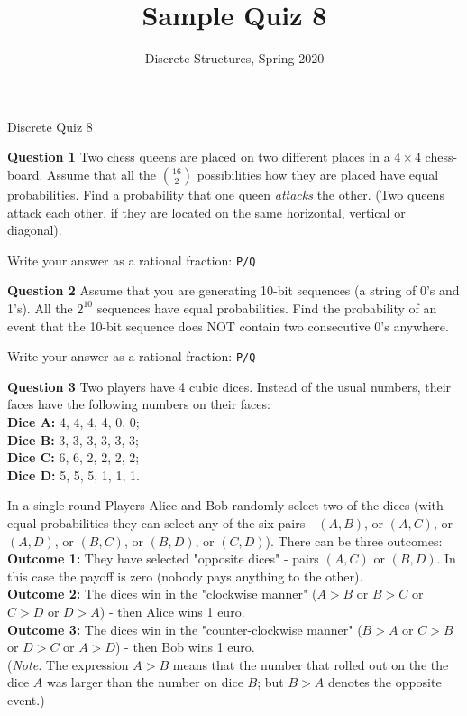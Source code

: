 \documentclass[jou]{apa6}
\title{Sample Quiz 8}
\author{Discrete Structures, Spring 2020}
\affiliation{RBS}
\begin{document}
\thispagestyle{empty}

\twocolumn
{\Large Discrete Quiz 8}

\vspace{10pt}
{\bf Question 1} 
Two chess queens are placed on two different places in a $4 \times 4$ chess-board.
Assume that all the ${16 \choose 2}$ possibilities how they are placed have equal probabilities.
Find a probability that one queen {\em attacks} the other. (Two queens attack each other, if
they are located on the same horizontal, vertical or diagonal).

Write your answer as a rational fraction: {\tt P/Q}

\vspace{10pt}
{\bf Question 2} Assume that you are generating 10-bit sequences (a string of 0's and 1's). 
All the $2^{10}$ sequences have equal probabilities. 
Find the probability of an event that the 10-bit sequence does NOT contain two consecutive 0's anywhere.

Write your answer as a rational fraction: {\tt P/Q}

\vspace{10pt}
{\bf Question 3}
Two players have 4 cubic dices. Instead of the usual numbers, their faces have the following numbers on their faces:\\
{\bf Dice A:} 4, 4, 4, 4, 0, 0;\\
{\bf Dice B:} 3, 3, 3, 3, 3, 3;\\
{\bf Dice C:} 6, 6, 2, 2, 2, 2;\\
{\bf Dice D:} 5, 5, 5, 1, 1, 1.

In a single round Players Alice and Bob randomly select two of the dices (with equal probabilities they can 
select any of the six pairs - $(A,B)$, or $(A,C)$, or $(A,D)$, or $(B,C)$, or $(B,D)$, or $(C,D)$).
There can be three outcomes:\\
{\bf Outcome 1:} They have selected "opposite dices" - pairs $(A,C)$ or $(B,D)$. In this case the payoff
is zero (nobody pays anything to the other).\\
{\bf Outcome 2:} The dices win in the "clockwise manner" ($A>B$ or $B>C$ or $C>D$ or $D>A$) - then Alice
wins 1 euro.\\
{\bf Outcome 3:} The dices win in the "counter-clockwise manner" ($B>A$ or $C>B$ or $D>C$ or $A>D$) - then Bob
wins 1 euro.\\
({\em Note.} The expression $A>B$ means that the number that rolled out on the the dice $A$ was larger than the number on dice $B$; 
but $B>A$ denotes the opposite event.)
\end{document}

